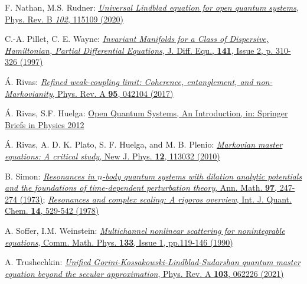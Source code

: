 \documentclass[letterpaper,onecolumn,11pt,accepted=2021-12-09]{quantumarticle}
\numberwithin{equation}{section}
\begin{document}
\begin{thebibliography}{}
F. Nathan, M.S. Rudner: \href{http://dx.doi.org/10.1103/PhysRevB.102.115109}{{\em Universal Lindblad equation for open quantum systems}, Phys. Rev. B {\em 102}, 115109 (2020)}

C.-A. Pillet, C. E. Wayne: \href{http://dx.doi.org/10.1006/jdeq.1997.3345}{{\em Invariant Manifolds for a Class of Dispersive, Hamiltonian, Partial Differential Equations},  J. Diff. Equ., {\bf 141}, Issue 2, p. 310-326 (1997)}


\'A. Rivas: \href{http://dx.doi.org/10.1103/PhysRevA.95.042104}{{\em Refined weak-coupling limit: Coherence, entanglement, and non-Markovianity}, Phys. Rev. A {\bf 95}, 042104 (2017)}


\'A. Rivas, S.F. Huelga: \href{http://dx.doi.org/10.1007/978-3-642-23354-8}{Open Quantum Systems, An Introduction, in: Springer Briefs in Physics 2012}

\'A. Rivas, A. D. K. Plato, S. F. Huelga, and M. B. Plenio: \href{http://dx.doi.org/10.1088/1367-2630/12/11/113032}{{\em 
Markovian master equations: A critical study}, New J. Phys. {\bf 12},
113032 (2010)}

B. Simon: \href{https://doi.org/10.2307/1970847}{{\em Resonances in $n$-body quantum systems with dilation analytic potentials and the foundations of time-dependent perturbation theory}, Ann. Math. {\bf 97}, 247-274 (1973)};  \quad \href{http://dx.doi.org/10.1002/qua.560140415}{{\em Resonances and complex scaling: A rigoros overview}, Int. J. Quant. Chem. {\bf 14}, 529-542 (1978)}

A. Soffer, I.M. Weinstein: \href{http://dx.doi.org/10.1007/BF02096557}{{\em Multichannel nonlinear scattering for nonintegrable equations},  Comm. Math. Phys. {\bf 133}, Issue 1, pp.119-146 (1990)}

A. Trushechkin: \href{http://dx.doi.org/10.1103/PhysRevA.103.062226}{{\em Unified Gorini-Kossakowski-Lindblad-Sudarshan quantum master equation beyond the secular approximation}, Phys. Rev. A {\bf 103}, 062226 (2021)}


\end{thebibliography}
\end{document}
